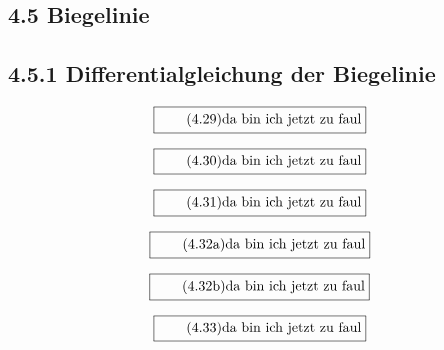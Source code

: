 \documentclass[11pt]{article}
\newcommand{\1}{ {\mathds{1}} }
\begin{document}
    \subsection*{4.5 Biegelinie}
    \subsection*{4.5.1 Differentialgleichung der Biegelinie}

    \begin{equation}
      \boxed{
        \tag{4.29}
        \begin{split}
          \text{da bin ich jetzt zu faul}
        \end{split}
      }
    \end{equation}

    \begin{equation}
      \boxed{
        \tag{4.30}
        \begin{split}
          \text{da bin ich jetzt zu faul}
        \end{split}
      }
    \end{equation}

    \begin{equation}
      \boxed{
        \tag{4.31}
        \begin{split}
          \text{da bin ich jetzt zu faul}
        \end{split}
      }
    \end{equation}

    \begin{equation}
      \boxed{
        \tag{4.32a}
        \begin{split}
          \text{da bin ich jetzt zu faul}
        \end{split}
      }
    \end{equation}

    \begin{equation}
      \boxed{
        \tag{4.32b}
        \begin{split}
          \text{da bin ich jetzt zu faul}
        \end{split}
      }
    \end{equation}
    
    \begin{equation}
      \boxed{
        \tag{4.33}
        \begin{split}
          \text{da bin ich jetzt zu faul}
        \end{split}
      }
    \end{equation}
\end{document}
